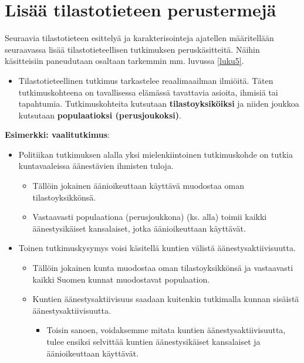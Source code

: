 \documentclass[
]{book}
\providecommand{\tightlist}{%
  \setlength{\itemsep}{0pt}\setlength{\parskip}{0pt}}
\begin{document}
\hypertarget{alaluku31}{%
\section{Lisää tilastotieteen perustermejä}\label{alaluku31}}

Seuraavia tilastotieteen esittelyä ja karakterisointeja ajatellen määritellään seuraavassa lisää tilastotieteellisen tutkimuksen peruskäsitteitä. Näihin käsitteisiin paneudutaan osaltaan tarkemmin mm. luvussa \ref{luku5}.

\begin{itemize}
\tightlist
\item
  Tilastotieteellinen tutkimus tarkastelee reaalimaailman ilmiöitä. Täten tutkimuskohteena on tavallisessa elämässä tavattavia asioita, ihmisiä tai tapahtumia. Tutkimuskohteita kutsutaan \textbf{tilastoyksiköiksi} ja niiden joukkoa kutsutaan \textbf{populaatioksi (perusjoukoksi)}.
\end{itemize}

\newpage

\begin{eblock}{}

\textbf{Esimerkki: vaalitutkimus}:

\begin{itemize}
\tightlist
\item
  Politiikan tutkimuksen alalla yksi mielenkiintoinen tutkimuskohde on tutkia kuntavaaleissa äänestävien ihmisten tuloja.

  \begin{itemize}
  \tightlist
  \item
    Tällöin jokainen äänioikeuttaan käyttävä muodostaa oman tilastoyksikkönsä.
  \item
    Vastaavasti populaationa (perusjoukkona) (ks. alla) toimii kaikki äänestysikäiset kansalaiset, jotka äänioikeuttaan käyttävät.
  \end{itemize}
\item
  Toinen tutkimuskysymys voisi käsitellä kuntien välistä äänestysaktiivisuutta.

  \begin{itemize}
  \tightlist
  \item
    Tällöin jokainen kunta muodostaa oman tilastoyksikkönsä ja vastaavasti kaikki Suomen kunnat muodostavat populaation.
  \item
    Kuntien äänestysaktiivisuus saadaan kuitenkin tutkimalla kunnan sisäistä äänestysaktiivisuutta.

    \begin{itemize}
    \tightlist
    \item
      Toisin sanoen, voidaksemme mitata kuntien äänestysaktiivisuutta, tulee ensiksi selvittää kuntien äänestysikäiset kansalaiset ja äänioikeuttaan käyttävät.
    \end{itemize}
  \end{itemize}
\end{itemize}

\end{eblock}
\end{document}
